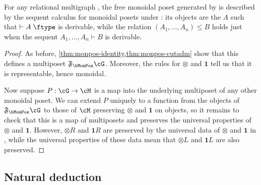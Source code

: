\documentclass{book}
\let\types\vdash
\def\type{\;\ftype}
\newcommand{\F}[1]{\mathfrak{F}_{#1}}
\def\one{\mathbf{1}}
\let\tensor\otimes
\def\tensorL{\mathord{\tensor}L}
\def\tensorR{\mathord{\tensor}R}
\begin{document}
\begin{thm}\label{thm:monpos-initial}
  For any relational multigraph \cG, the free monoidal poset generated by \cG is described by the sequent calculus for monoidal posets under \cG: its objects are the $A$ such that $\types A\type$ is derivable, while the relation $(A_1,\dots,A_n)\le B$ holds just when the sequent $A_1,\dots,A_n\types B$ is derivable.
\end{thm}
\begin{proof}
  As before, \cref{thm:monpos-identity,thm:monpos-cutadm} show that this defines a multiposet $\F\bMonPos\cG$.
  Moreover, the rules for $\tensor$ and $\one$ tell us that it is representable, hence monoidal.

  Now suppose $P:\cG\to\cM$ is a map into the underlying multiposet of any other monoidal poset.
  We can extend $P$ uniquely to a function from the objects of $\F\bMonPos\cG$ to those of $\cM$ preserving $\tensor$ and $\one$ on objects, so it remains to check that this is a map of multiposets and preserves the universal properties of $\tensor$ and $\one$.
  However, $\tensorR$ and $\one R$ are preserved by the universal data of $\tensor$ and $\one$ in \cM, while the universal properties of these data mean that $\tensorL$ and $\one L$ are also preserved.
\end{proof}

\subsection{Natural deduction}
\label{sec:natded-monpos}
\end{document}
